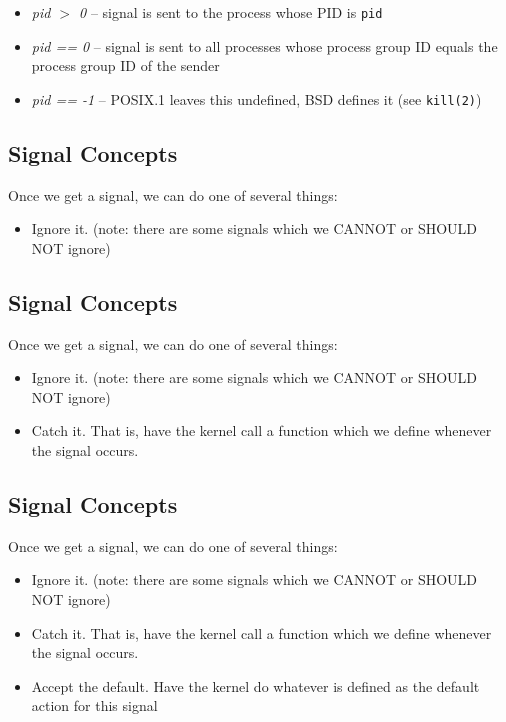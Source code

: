 \documentclass[xga]{xdvislides}
\begin{document}
\begin{itemize}
	\item {\em pid $>$ 0} -- signal is sent to the process whose PID is {\tt pid}
	\item {\em pid == 0} -- signal is sent to all processes whose process
		group ID equals the process group ID of the sender
	\item {\em pid == -1} -- POSIX.1 leaves this undefined, BSD defines it
		(see {\tt kill(2)})
\end{itemize}

\subsection{Signal Concepts}
Once we get a signal, we can do one of several things:

\begin{itemize}
	\item Ignore it. (note: there are some signals which we CANNOT or SHOULD NOT
		ignore)
\end{itemize}

\subsection{Signal Concepts}
Once we get a signal, we can do one of several things:

\begin{itemize}
	\item Ignore it. (note: there are some signals which we CANNOT or SHOULD NOT
		ignore)
	\item Catch it. That is, have the kernel call a function which we define
		whenever the signal occurs.
\end{itemize}


\subsection{Signal Concepts}
Once we get a signal, we can do one of several things:

\begin{itemize}
	\item Ignore it. (note: there are some signals which we CANNOT or SHOULD NOT
		ignore)
	\item Catch it. That is, have the kernel call a function which we define
		whenever the signal occurs.
	\item Accept the default. Have the kernel do whatever is defined as the
		default action for this signal
\end{itemize}
\end{document}
